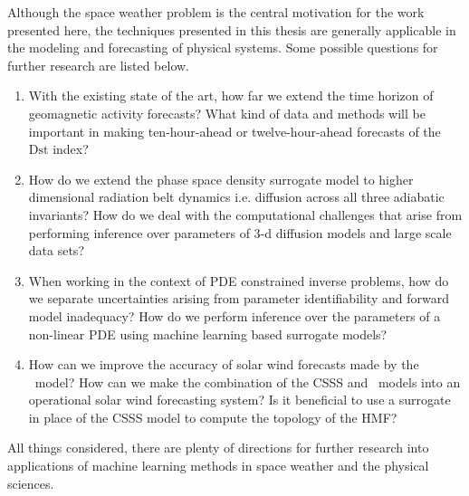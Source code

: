 Although the space weather problem is the central motivation for the work presented here, the 
techniques presented in this thesis are generally applicable in the modeling and forecasting of 
physical systems. Some possible questions for further research are listed below.
%
\begin{enumerate}
    \item With the existing state of the art, how far we extend the time horizon of geomagnetic 
          activity forecasts? What kind of data and methods will be important in making 
          ten-hour-ahead or twelve-hour-ahead forecasts of the $\mathrm{Dst}$ index?
    \item How do we extend the phase space density surrogate model to higher dimensional 
          radiation belt dynamics i.e. diffusion across all three adiabatic invariants?
          How do we deal with the computational challenges that arise from performing inference 
          over parameters of $3$-d diffusion models and large scale data sets? 
    \item When working in the context of PDE constrained inverse problems, how do we separate 
          uncertainties arising from parameter identifiability and forward model inadequacy? How do 
          we perform inference over the parameters of a non-linear PDE using machine learning based 
          surrogate models?
    \item How can we improve the accuracy of solar wind forecasts made by the \XX \ model? How can 
          we make the combination of the CSSS and \XX \ models into an operational solar wind 
          forecasting system? Is it beneficial to use a surrogate in place of the CSSS model to 
          compute the topology of the HMF? 
\end{enumerate}
%
All things considered, there are plenty of directions for further research into applications of 
machine learning methods in space weather and the physical sciences.
